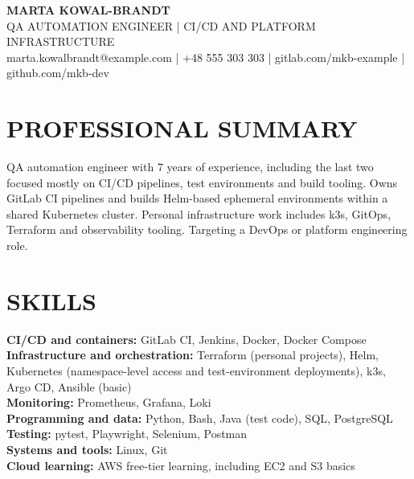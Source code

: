 \documentclass[11pt,a4paper]{article}
\begin{document}
\begin{center}
{\LARGE\bfseries MARTA KOWAL-BRANDT}\\[0.25em]
{\large QA AUTOMATION ENGINEER | CI/CD AND PLATFORM INFRASTRUCTURE}\\[0.25em]
marta.kowalbrandt@example.com | +48 555 303 303 | gitlab.com/mkb-example | github.com/mkb-dev
\end{center}
\section*{PROFESSIONAL SUMMARY}
QA automation engineer with 7 years of experience, including the last two focused mostly on CI/CD pipelines, test environments and build tooling. Owns GitLab CI pipelines and builds Helm-based ephemeral environments within a shared Kubernetes cluster. Personal infrastructure work includes k3s, GitOps, Terraform and observability tooling. Targeting a DevOps or platform engineering role.
\section*{SKILLS}
\textbf{CI/CD and containers:} GitLab CI, Jenkins, Docker, Docker Compose\\
\textbf{Infrastructure and orchestration:} Terraform (personal projects), Helm, Kubernetes (namespace-level access and test-environment deployments), k3s, Argo CD, Ansible (basic)\\
\textbf{Monitoring:} Prometheus, Grafana, Loki\\
\textbf{Programming and data:} Python, Bash, Java (test code), SQL, PostgreSQL\\
\textbf{Testing:} pytest, Playwright, Selenium, Postman\\
\textbf{Systems and tools:} Linux, Git\\
\textbf{Cloud learning:} AWS free-tier learning, including EC2 and S3 basics
\end{document}
